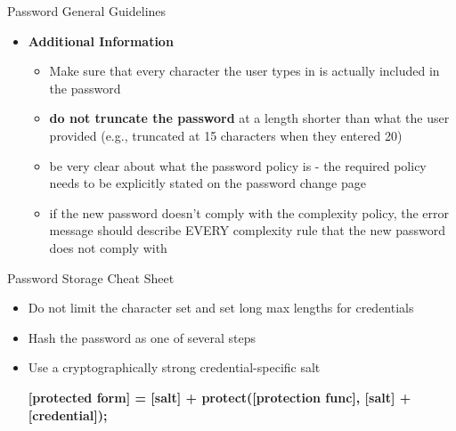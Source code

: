 \documentclass[pdf]{beamer}
\begin{document}
\begin{frame}{Password General Guidelines}
\begin{itemize}
\item
\textbf{Additional Information}
\begin{itemize}
\item
Make sure that every character the user types in is actually included in the password

\item
\textbf{do not truncate the password} at a length shorter than what the user provided (e.g., truncated at 15 characters when they entered 20)

\item
be very clear about what the password policy is - the required policy needs to be explicitly stated on the password change page

\item
if the new password doesn't comply with the complexity policy, the error message should describe EVERY complexity rule that the new password does not comply with
\end{itemize}
\end{itemize}
\end{frame}



\begin{frame}{Password Storage Cheat Sheet}
\begin{itemize}
\item
Do not limit the character set and set long max lengths for credentials

\item
Hash the password as one of several steps

\item
Use a cryptographically strong credential-specific salt
\newline

\textbf{[protected form] = [salt] + protect([protection func], [salt] + [credential]); }
\newline
\end{itemize}
\end{frame}
\end{document}
